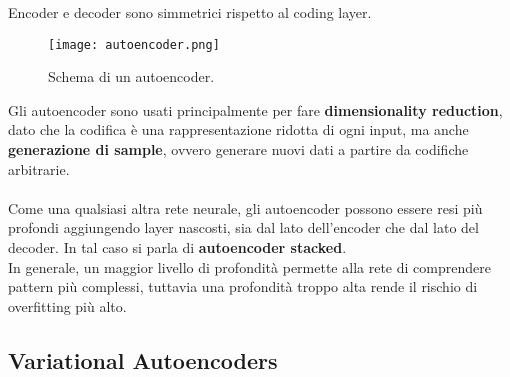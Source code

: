 Encoder e decoder sono simmetrici rispetto al coding layer.
\begin{figure}[H]
	\centering
	\texttt{[image: autoencoder.png]}
	\caption{Schema di un autoencoder.}
	\label{fig:autoencoder}
\end{figure}
Gli autoencoder sono usati principalmente per fare \textbf{dimensionality reduction}, dato che la codifica è una rappresentazione ridotta di ogni input, ma anche \textbf{generazione di sample}, ovvero generare nuovi dati a partire da codifiche arbitrarie.\\
\\
Come una qualsiasi altra rete neurale, gli autoencoder possono essere resi più profondi aggiungendo layer nascosti, sia dal lato dell'encoder che dal lato del decoder. In tal caso si parla di \textbf{autoencoder stacked}.\\
In generale, un maggior livello di profondità permette alla rete di comprendere pattern più complessi, tuttavia una profondità troppo alta rende il rischio di overfitting più alto.

\subsection{Variational Autoencoders}


